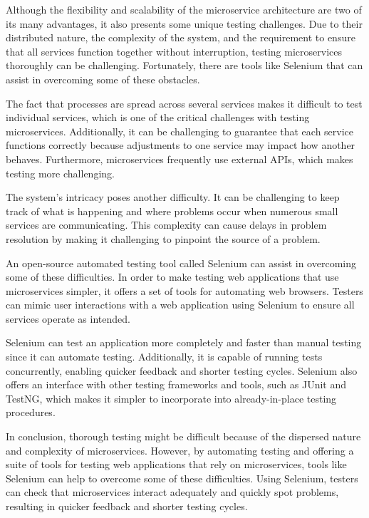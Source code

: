 Although the flexibility and scalability of the microservice architecture are two of its many advantages, it also presents some unique testing challenges. Due to their distributed nature, the complexity of the system, and the requirement to ensure that all services function together without interruption, testing microservices thoroughly can be challenging. Fortunately, there are tools like Selenium that can assist in overcoming some of these obstacles.

The fact that processes are spread across several services makes it difficult to test individual services, which is one of the critical challenges with testing microservices. Additionally, it can be challenging to guarantee that each service functions correctly because adjustments to one service may impact how another behaves. Furthermore, microservices frequently use external APIs, which makes testing more challenging.

The system's intricacy poses another difficulty. It can be challenging to keep track of what is happening and where problems occur when numerous small services are communicating. This complexity can cause delays in problem resolution by making it challenging to pinpoint the source of a problem.

An open-source automated testing tool called Selenium can assist in overcoming some of these difficulties. In order to make testing web applications that use microservices simpler, it offers a set of tools for automating web browsers. Testers can mimic user interactions with a web application using Selenium to ensure all services operate as intended.

Selenium can test an application more completely and faster than manual testing since it can automate testing. Additionally, it is capable of running tests concurrently, enabling quicker feedback and shorter testing cycles. Selenium also offers an interface with other testing frameworks and tools, such as JUnit and TestNG, which makes it simpler to incorporate into already-in-place testing procedures.

In conclusion, thorough testing might be difficult because of the dispersed nature and complexity of microservices. However, by automating testing and offering a suite of tools for testing web applications that rely on microservices, tools like Selenium can help to overcome some of these difficulties. Using Selenium, testers can check that microservices interact adequately and quickly spot problems, resulting in quicker feedback and shorter testing cycles.


